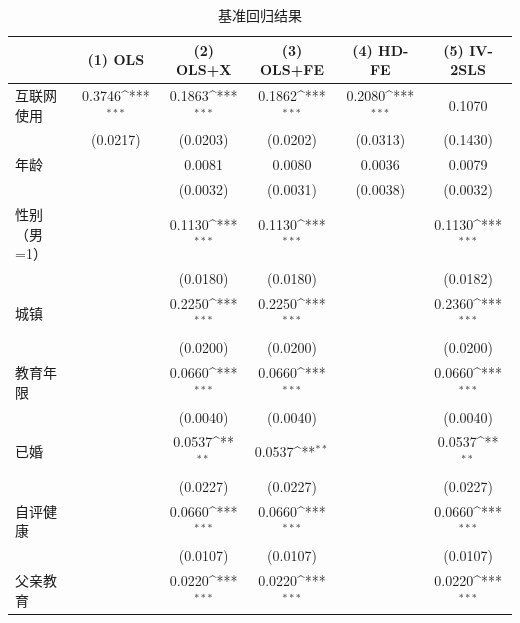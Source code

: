 \documentclass[a4paper,11pt]{article}
\def\sym#1{\ifmmode^{#1}\else\(^{#1}\)\fi}
\begin{document}
\begin{table}[htbp]
\centering
\caption{基准回归结果}
\label{tab:main_regs}
\begin{tabular}{lccccc}
\hline\hline
                &\multicolumn{1}{c}{(1) OLS}&\multicolumn{1}{c}{(2) OLS+X}&\multicolumn{1}{c}{(3) OLS+FE}&\multicolumn{1}{c}{(4) HD-FE}&\multicolumn{1}{c}{(5) IV-2SLS}\\
\hline
互联网使用       &   0.3746\sym{***}&   0.1863\sym{***}&   0.1862\sym{***}&   0.2080\sym{***}&   0.1070         \\
                & (0.0217)         & (0.0203)         & (0.0202)         & (0.0313)         & (0.1430)         \\
年龄            &                  &   0.0081         &   0.0080         &   0.0036         &   0.0079         \\
                &                  & (0.0032)         & (0.0031)         & (0.0038)         & (0.0032)         \\
性别（男=1）     &                  &   0.1130\sym{***}&   0.1130\sym{***}&                  &   0.1130\sym{***}\\
                &                  & (0.0180)         & (0.0180)         &                  & (0.0182)         \\
城镇            &                  &   0.2250\sym{***}&   0.2250\sym{***}&                  &   0.2360\sym{***}\\
                &                  & (0.0200)         & (0.0200)         &                  & (0.0200)         \\
教育年限         &                  &   0.0660\sym{***}&   0.0660\sym{***}&                  &   0.0660\sym{***}\\
                &                  & (0.0040)         & (0.0040)         &                  & (0.0040)         \\
已婚            &                  &   0.0537\sym{**} &   0.0537\sym{**} &                  &   0.0537\sym{**} \\
                &                  & (0.0227)         & (0.0227)         &                  & (0.0227)         \\
自评健康         &                  &   0.0660\sym{***}&   0.0660\sym{***}&                  &   0.0660\sym{***}\\
                &                  & (0.0107)         & (0.0107)         &                  & (0.0107)         \\
父亲教育         &                  &   0.0220\sym{***}&   0.0220\sym{***}&                  &   0.0220\sym{***}\\

\end{tabular}
\end{table}
\end{document}
